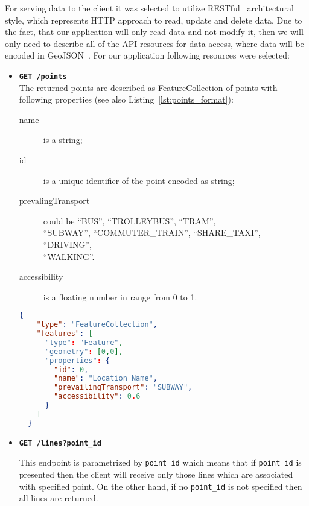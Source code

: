 For serving data to the client it was selected to utilize RESTful~\cite{rest:wiki} architectural
style, which represents HTTP approach to read, update and delete data. Due to the fact, that our
application will only read data and not modify it, then we will only need to describe all of
the API resources for data access, where data will be encoded in
GeoJSON~\cite{geojson:spec}. For our application following resources were selected:

\begin{itemize}
  \item \textbf{\texttt{GET /points}} \\
  The returned points are described as FeatureCollection of points with following
  properties (see also Listing~\ref{lst:points_format}):

  \begin{description}
    \item[name] is a string;
    \item[id] is a unique identifier of the point encoded as string;
    \item[prevalingTransport] could be \mbox{``BUS''}, \mbox{``TROLLEYBUS''},
    \mbox{``TRAM''}, \\ \mbox{``SUBWAY''}, \mbox{``COMMUTER\_TRAIN''}, \mbox{``SHARE\_TAXI''},
    \mbox{``DRIVING''}, \\ \mbox{``WALKING''}.
    \item[accessibility] is a floating number in range from 0 to 1.
  \end{description}

  \begin{lstlisting}[language=json, caption=Points response example, label=lst:points_format]
  {
    "type": "FeatureCollection",
    "features": [
      "type": "Feature",
      "geometry": [0,0],
      "properties": {
        "id": 0,
        "name": "Location Name",
        "prevailingTransport": "SUBWAY",
        "accessibility": 0.6
      }
    ]
  }
  \end{lstlisting}

  \item \textbf{\texttt{GET /lines?point\_id}}

  This endpoint is parametrized by \texttt{point\_id} which means that if \texttt{point\_id} is
  presented then the client will receive only those lines which are associated with specified point.
  On the other hand, if no \texttt{point\_id} is not specified then all lines are returned.


\end{itemize}
